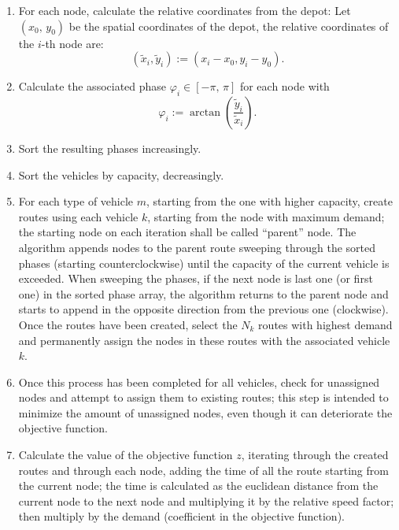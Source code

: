 \documentclass[10pt,twoside]{article}
\begin{document}
\begin{enumerate}
  \item For each node, calculate the relative coordinates from the depot: Let $(x_0,\,y_0)$ be the spatial coordinates of the depot, the relative coordinates of the $i$-th node are:\[(\tilde{x}_i, \tilde{y}_i):=(x_i-x_0,y_i-y_0).\]
  \item Calculate the associated phase $\varphi_i\in[-\pi,\,\pi]$ for each node with
  \[\varphi_i := \arctan\left(\dfrac{\tilde{y}_i}{\tilde{x}_i}\right).\]
  \item Sort the resulting phases increasingly.
  \item Sort the vehicles by capacity, decreasingly.
  \item For each type of vehicle $m$, starting from the one with higher capacity, create routes using each vehicle $k$, starting from the node with maximum demand; the starting node on each iteration shall be called ``parent'' node. The algorithm appends nodes to the parent route sweeping through the sorted phases (starting counterclockwise) until the capacity of the current vehicle is exceeded. When sweeping the phases, if the next node is last one (or first one) in the sorted phase array, the algorithm returns to the parent node and starts to append in the opposite direction from the previous one (clockwise). Once the routes have been created, select the $N_k$ routes with highest demand and permanently assign the nodes in these routes with the associated vehicle $k$.
  \item Once this process has been completed for all vehicles, check for unassigned nodes and attempt to assign them to existing routes; this step is intended to minimize the amount of unassigned nodes, even though it can deteriorate the objective function.
  \item Calculate the value of the objective function $z$, iterating through the created routes and through each node, adding the time of all the route starting from the current node; the time is calculated as the euclidean distance from the current node to the next node and multiplying it by the relative speed factor; then multiply by the demand (coefficient in the objective function).
\end{enumerate}
\end{document}
